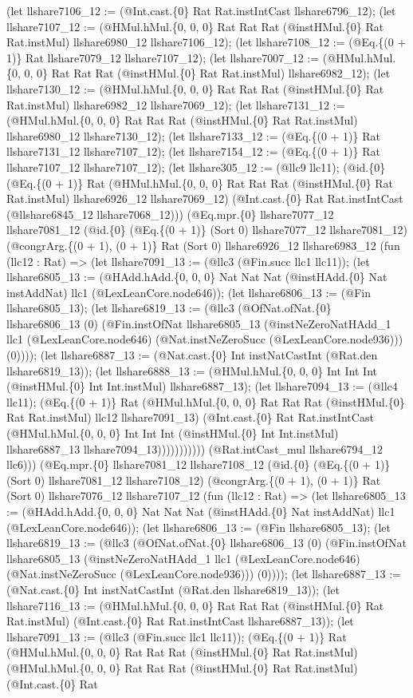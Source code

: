 \documentclass[11pt]{article}
\begin{document}
(let llshare7106\_12 := (@Int.cast.\{0\} Rat Rat.instIntCast llshare6796\_12); (let llshare7107\_12 := (@HMul.hMul.\{0, 0, 0\} Rat Rat Rat (@instHMul.\{0\} Rat Rat.instMul) llshare6980\_12 llshare7106\_12); (let llshare7108\_12 := (@Eq.\{(0 + 1)\} Rat llshare7079\_12 llshare7107\_12); (let llshare7007\_12 := (@HMul.hMul.\{0, 0, 0\} Rat Rat Rat (@instHMul.\{0\} Rat Rat.instMul) llshare6982\_12); (let llshare7130\_12 := (@HMul.hMul.\{0, 0, 0\} Rat Rat Rat (@instHMul.\{0\} Rat Rat.instMul) llshare6982\_12 llshare7069\_12); (let llshare7131\_12 := (@HMul.hMul.\{0, 0, 0\} Rat Rat Rat (@instHMul.\{0\} Rat Rat.instMul) llshare6980\_12 llshare7130\_12); (let llshare7133\_12 := (@Eq.\{(0 + 1)\} Rat llshare7131\_12 llshare7107\_12); (let llshare7154\_12 := (@Eq.\{(0 + 1)\} Rat llshare7107\_12 llshare7107\_12); (let llshare305\_12 := (@llc9 llc11); (@id.\{0\} (@Eq.\{(0 + 1)\} Rat (@HMul.hMul.\{0, 0, 0\} Rat Rat Rat (@instHMul.\{0\} Rat Rat.instMul) llshare6926\_12 llshare7069\_12) (@Int.cast.\{0\} Rat Rat.instIntCast (@llshare6845\_12 llshare7068\_12))) (@Eq.mpr.\{0\} llshare7077\_12 llshare7081\_12 (@id.\{0\} (@Eq.\{(0 + 1)\} (Sort 0) llshare7077\_12 llshare7081\_12) (@congrArg.\{(0 + 1), (0 + 1)\} Rat (Sort 0) llshare6926\_12 llshare6983\_12 (fun (llc12 : Rat) => (let llshare7091\_13 := (@llc3 (@Fin.succ llc1 llc11)); (let llshare6805\_13 := (@HAdd.hAdd.\{0, 0, 0\} Nat Nat Nat (@instHAdd.\{0\} Nat instAddNat) llc1 (@LexLeanCore.node646)); (let llshare6806\_13 := (@Fin llshare6805\_13); (let llshare6819\_13 := (@llc3 (@OfNat.ofNat.\{0\} llshare6806\_13 (0) (@Fin.instOfNat llshare6805\_13 (@instNeZeroNatHAdd\_1 llc1 (@LexLeanCore.node646) (@Nat.instNeZeroSucc (@LexLeanCore.node936))) (0)))); (let llshare6887\_13 := (@Nat.cast.\{0\} Int instNatCastInt (@Rat.den llshare6819\_13)); (let llshare6888\_13 := (@HMul.hMul.\{0, 0, 0\} Int Int Int (@instHMul.\{0\} Int Int.instMul) llshare6887\_13); (let llshare7094\_13 := (@llc4 llc11); (@Eq.\{(0 + 1)\} Rat (@HMul.hMul.\{0, 0, 0\} Rat Rat Rat (@instHMul.\{0\} Rat Rat.instMul) llc12 llshare7091\_13) (@Int.cast.\{0\} Rat Rat.instIntCast (@HMul.hMul.\{0, 0, 0\} Int Int Int (@instHMul.\{0\} Int Int.instMul) llshare6887\_13 llshare7094\_13))))))))))) (@Rat.intCast\_mul llshare6794\_12 llc6))) (@Eq.mpr.\{0\} llshare7081\_12 llshare7108\_12 (@id.\{0\} (@Eq.\{(0 + 1)\} (Sort 0) llshare7081\_12 llshare7108\_12) (@congrArg.\{(0 + 1), (0 + 1)\} Rat (Sort 0) llshare7076\_12 llshare7107\_12 (fun (llc12 : Rat) => (let llshare6805\_13 := (@HAdd.hAdd.\{0, 0, 0\} Nat Nat Nat (@instHAdd.\{0\} Nat instAddNat) llc1 (@LexLeanCore.node646)); (let llshare6806\_13 := (@Fin llshare6805\_13); (let llshare6819\_13 := (@llc3 (@OfNat.ofNat.\{0\} llshare6806\_13 (0) (@Fin.instOfNat llshare6805\_13 (@instNeZeroNatHAdd\_1 llc1 (@LexLeanCore.node646) (@Nat.instNeZeroSucc (@LexLeanCore.node936))) (0)))); (let llshare6887\_13 := (@Nat.cast.\{0\} Int instNatCastInt (@Rat.den llshare6819\_13)); (let llshare7116\_13 := (@HMul.hMul.\{0, 0, 0\} Rat Rat Rat (@instHMul.\{0\} Rat Rat.instMul) (@Int.cast.\{0\} Rat Rat.instIntCast llshare6887\_13)); (let llshare7091\_13 := (@llc3 (@Fin.succ llc1 llc11)); (@Eq.\{(0 + 1)\} Rat (@HMul.hMul.\{0, 0, 0\} Rat Rat Rat (@instHMul.\{0\} Rat Rat.instMul) (@HMul.hMul.\{0, 0, 0\} Rat Rat Rat (@instHMul.\{0\} Rat Rat.instMul) (@Int.cast.\{0\} Rat 
\end{document}
